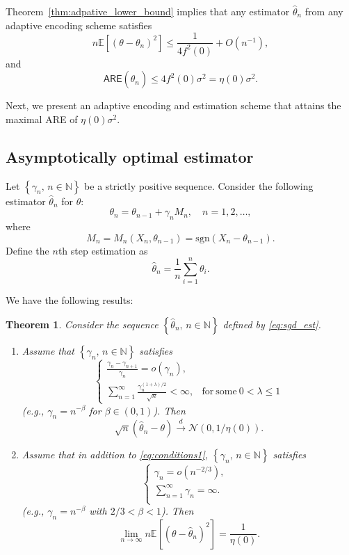 \documentclass[letterpaper, 11pt]{IEEEtran}      %
\newtheorem{thm}{\bf{Theorem}}
\newcommand{\ARE}{\mathsf{ARE}}
\newcommand{\sgn}{\mathrm{sgn} }
\begin{document}
Theorem~\ref{thm:adpative_lower_bound} implies that any estimator $\hat{\theta}_n$ from any adaptive encoding scheme satisfies
\[
n\mathbb E\left[ (\theta-\theta_n)^2 \right] \leq  \frac{1}{4f^2(0)}+O(n^{-1}),
\]
and 
\[
\ARE(\hat{\theta}_n) \leq 4f^2(0)\sigma^2 = \eta(0)\sigma^2.
\]

Next, we present an adaptive encoding and estimation scheme that attains the maximal ARE of $\eta(0)\sigma^2$. 

\subsection{Asymptotically optimal estimator}
Let $\left\{ \gamma_n,\, n\in \mathbb N \right\}$ be a strictly positive sequence. Consider the following estimator $\hat{\theta}_n$ for $\theta$:  
\begin{equation}
\label{eq:sgd_alg}
\theta_n = \theta_{n-1} +  \gamma_n M_n, \quad n = 1,2,\ldots,
\end{equation}
where 
\begin{equation}
M_n = M_n (X_n,\theta_{n-1}) =\sgn (X_n - \theta_{n-1}).
\end{equation}
Define the $n$th step estimation as
\begin{equation} \label{eq:sgd_est}
\hat{\theta}_n =  \frac{1}{n} \sum_{i=1}^n  \theta_i. 
\end{equation}

We have the following results:
\begin{thm} \label{thm:sgd}
Consider the sequence $\left\{\hat{\theta}_n,\, n\in \mathbb N \right\}$ defined by \eqref{eq:sgd_est}. 
\begin{enumerate}
\item[(i)] Assume that $\left\{ \gamma_n,\, n\in \mathbb N \right\}$ satisfies
\begin{equation} \label{eq:conditions1}
\begin{cases}
\frac{\gamma_n - \gamma_{n+1}}{\gamma_n} = o(\gamma_n), &  \\
\sum_{n=1}^\infty \frac{\gamma_n^{(1+\lambda)/2}} {\sqrt{n}} < \infty, & 
\mathrm{for~some~}0< \lambda \leq 1
\end{cases}
\end{equation}
(e.g., $\gamma_n = n^{-\beta}$ for $\beta \in (0,1)$). Then
\[
\sqrt{n} \left( \hat{\theta}_n - \theta \right) \overset{d}{\rightarrow} \mathcal N \left(0,  1/\eta(0) \right).
\]
\item[(ii)] Assume that in addition to \eqref{eq:conditions1}, $\left\{ \gamma_n,\, n\in \mathbb N \right\}$ satisfies
\begin{equation} \label{eq:conditions2}
\begin{cases}
\gamma_n = o(n^{-2/3}), &  \\
\sum_{n=1}^\infty \gamma_n = \infty.  & \\
\end{cases}
\end{equation}
(e.g., $\gamma_n = n^{-\beta}$ with $2/3<\beta<1$). Then
\[
\lim_{n\rightarrow \infty} n\mathbb E \left[ \left(\theta-\hat{\theta}_n \right)^2 \right] = \frac{1}{\eta(0)}. 
\]
\end{enumerate}
\end{thm}
\end{document}

